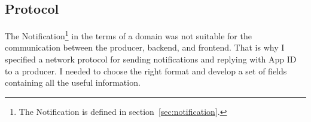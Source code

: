 \subsection{Protocol}\label{sec:protocol}

The Notification\footnote{
  The Notification is defined in section~\ref{sec:notification}.
} in the terms of a domain
was not suitable for the communication
between the producer, backend, and frontend.
That is why I specified a network protocol
for sending notifications
and replying with App \ac{ID} to a producer.
I needed to choose the right format
and develop a set of fields
containing all the useful information.



